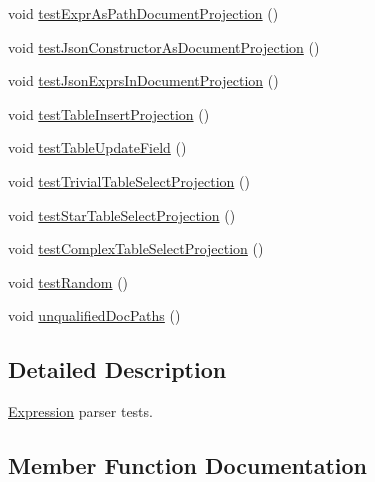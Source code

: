 \begin{DoxyCompactItemize}
\item 
void \mbox{\hyperlink{classcom_1_1mysql_1_1cj_1_1xdevapi_1_1_expr_parser_test_ae76331c32a97f02c0148df7624f7646b}{test\+Expr\+As\+Path\+Document\+Projection}} ()
\item 
void \mbox{\hyperlink{classcom_1_1mysql_1_1cj_1_1xdevapi_1_1_expr_parser_test_ac4d9d88b835c71ee289bba9fb792ed27}{test\+Json\+Constructor\+As\+Document\+Projection}} ()
\item 
void \mbox{\hyperlink{classcom_1_1mysql_1_1cj_1_1xdevapi_1_1_expr_parser_test_af9d20099a9916a0c6ae442f2404952fe}{test\+Json\+Exprs\+In\+Document\+Projection}} ()
\item 
void \mbox{\hyperlink{classcom_1_1mysql_1_1cj_1_1xdevapi_1_1_expr_parser_test_ac2a1f14c831718682ff0bc42cffde357}{test\+Table\+Insert\+Projection}} ()
\item 
void \mbox{\hyperlink{classcom_1_1mysql_1_1cj_1_1xdevapi_1_1_expr_parser_test_a7cd4277418e741303b51d287635da180}{test\+Table\+Update\+Field}} ()
\item 
void \mbox{\hyperlink{classcom_1_1mysql_1_1cj_1_1xdevapi_1_1_expr_parser_test_ad70461844bab334c3f076b0801e1a2b1}{test\+Trivial\+Table\+Select\+Projection}} ()
\item 
void \mbox{\hyperlink{classcom_1_1mysql_1_1cj_1_1xdevapi_1_1_expr_parser_test_ab76eea997a560f5c68a0c8883bed75fd}{test\+Star\+Table\+Select\+Projection}} ()
\item 
void \mbox{\hyperlink{classcom_1_1mysql_1_1cj_1_1xdevapi_1_1_expr_parser_test_a5d93bf44220315720c64464b25b52ee3}{test\+Complex\+Table\+Select\+Projection}} ()
\item 
void \mbox{\hyperlink{classcom_1_1mysql_1_1cj_1_1xdevapi_1_1_expr_parser_test_afb1345adcc0f20d3397fb8d20caed9f4}{test\+Random}} ()
\item 
void \mbox{\hyperlink{classcom_1_1mysql_1_1cj_1_1xdevapi_1_1_expr_parser_test_a33f5dc42b756d3d21ca8e418fa76d14a}{unqualified\+Doc\+Paths}} ()
\end{DoxyCompactItemize}


\subsection{Detailed Description}
\mbox{\hyperlink{classcom_1_1mysql_1_1cj_1_1xdevapi_1_1_expression}{Expression}} parser tests. 

\subsection{Member Function Documentation}
\mbox{\label{classcom_1_1mysql_1_1cj_1_1xdevapi_1_1_expr_parser_test_a5d93bf44220315720c64464b25b52ee3}} 
